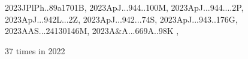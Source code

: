\documentclass[12pt]{article}
\begin{document}
\begin{description}
{2023JPlPh..89a1701B,%
2023ApJ...944..100M,%
2023ApJ...944....2P,%
2023ApJ...942L...2Z,%
2023ApJ...942...74S,%
2023ApJ...943..176G,%
2023AAS...24130146M,%
2023A&A...669A..98K%
},\item
\item %
37 times in 2022 \citep{
2022NatPh..18..595D,%
2022zndo...5807020C,%
2022MNRAS.517..560B,%
2022cosp...44.2553T,%
2022JAtS...79.1821L,%
2022JFM...952R...1K,%
2022BAAA...63...62O,%
2022PSJ.....3..166H,%
2022JPlPh..88f9002Z,%
2022arXiv220606566M,%
2022PhFl...34f5119L,%
2022ApJ...932....8K,%
2022PhFl...34d5113Y,%
2022arXiv220509261R,%
2022PhRvD.106j3536S,%
}
\end{description}
\end{document}

